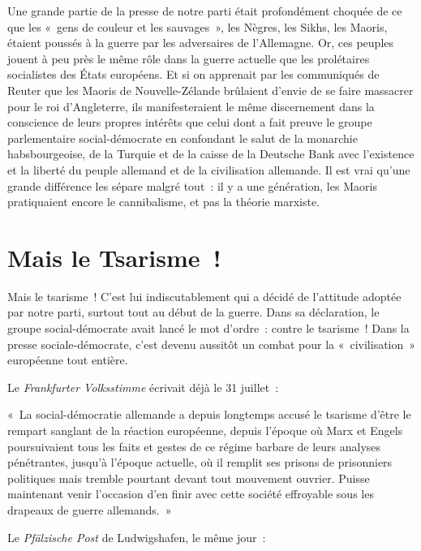 \documentclass[french,twoside]{book} %
\newenvironment{quoteblock}%
  {\begin{quoting}}
  {\end{quoting}}
\newenvironment{quotebar}{%
    \def\FrameCommand{{\color{rubric!10!}\vrule width 0.5em} \hspace{0.9em}}%
    \def\OuterFrameSep{\itemsep} %
    \MakeFramed {\advance\hsize-\width \FrameRestore}
  }%
  {%
    \endMakeFramed
  }
\renewenvironment{quoteblock}%
  {%
    \savenotes
    \setstretch{0.9}
    \normalfont
    \begin{quotebar}
  }
  {%
    \end{quotebar}
    \spewnotes
  }
\begin{document}
Une grande partie de la presse de notre parti était profondément choquée de ce que les « gens de couleur et les sauvages », les Nègres, les Sikhs, les Maoris, étaient poussés à la guerre par les adversaires de l’Allemagne. Or, ces peuples jouent à peu près le même rôle dans la guerre actuelle que les prolétaires socialistes des États européens. Et si on apprenait par les communiqués de Reuter que les Maoris de Nouvelle-Zélande brûlaient d’envie de se faire massacrer pour le roi d’Angleterre, ils manifesteraient le même discernement dans la conscience de leurs propres intérêts que celui dont a fait preuve le groupe parlementaire social-démocrate en confondant le salut de la monarchie habsbourgeoise, de la Turquie et de la caisse de la Deutsche Bank avec l’existence et la liberté du peuple allemand et de la civilisation allemande. Il est vrai qu’une grande différence les sépare malgré tout : il y a une génération, les Maoris pratiquaient encore le cannibalisme, et pas la théorie marxiste.
\section[{Mais le Tsarisme !}]{Mais le Tsarisme !}\renewcommand{\leftmark}{Mais le Tsarisme !}

\noindent Mais le tsarisme ! C'est lui indiscutablement qui a décidé de l’attitude adoptée par notre parti, surtout tout au début de la guerre. Dans sa déclaration, le groupe social-démocrate avait lancé le mot d’ordre : contre le tsarisme ! Dans la presse sociale-démocrate, c’est devenu aussitôt un combat pour la « civilisation » européenne tout entière.\par
Le \emph{Frankfurter Volksstimme} écrivait déjà le 31 juillet :\par

\begin{quoteblock}
 \noindent « La social-démocratie allemande a depuis longtemps accusé le tsarisme d’être le rempart sanglant de la réaction européenne, depuis l’époque où Marx et Engels poursuivaient tous les faits et gestes de ce régime barbare de leurs analyses pénétrantes, jusqu’à l’époque actuelle, où il remplit ses prisons de prisonniers politiques mais tremble pourtant devant tout  mouvement ouvrier. Puisse maintenant venir l’occasion d’en finir avec cette société effroyable sous les drapeaux de guerre allemands. »
\end{quoteblock}

\noindent Le \emph{Pfälzische Post} de Ludwigshafen, le même jour :\par
\end{document}
